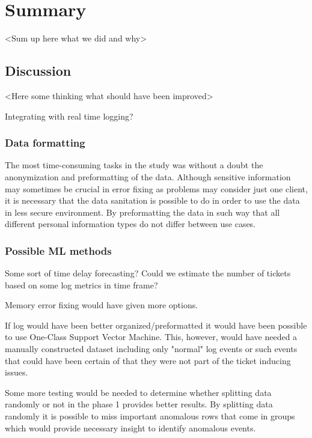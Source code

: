 
\section{Summary}\label{sec:summary}

<Sum up here what we did and why>

\subsection{Discussion}\label{subsec:discussion}
<Here some thinking what should have been improved>

Integrating with real time logging?

\subsubsection*{Data formatting}
The most time-consuming tasks in the study
was without a doubt
the anonymization and preformatting of the data.
Although sensitive information may sometimes be crucial in error fixing
as problems may consider just one client,
it is necessary that the data sanitation is possible to do
in order to use the data in less secure environment.
By preformatting the data in such way
that all different personal information types
do not differ between use cases.


\subsubsection*{Possible ML methods}
Some sort of time delay forecasting?\cite{erharter2021pointlessness}
Could we estimate the number of tickets
based on some log metrics in time frame?

Memory error fixing would have given more options.


If log would have been better organized/preformatted
it would have been possible to use One-Class Support Vector Machine.
This, however,
would have needed a manually constructed dataset
including only "normal" log events
or such events that could have been certain of
that they were not part of the ticket inducing issues.


Some more testing would be needed to determine
whether splitting data randomly or not in the phase 1
provides better results.
By splitting data randomly
it is possible to miss important anomalous rows that come in groups
which would provide necessary insight to identify anomalous events.

